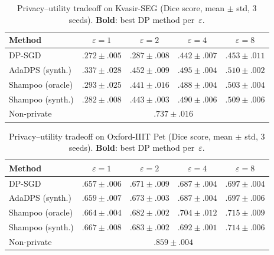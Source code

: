 \begin{table}[t]
\centering
\caption{Privacy--utility tradeoff on Kvasir-SEG (Dice score, mean $\pm$ std, 3 seeds).
  \textbf{Bold}: best DP method per~$\varepsilon$.}
\label{tab:eps_kvasir}
\setlength{\tabcolsep}{3.5pt}
\begin{tabular}{@{}lcccc@{}}
\toprule
\textbf{Method} &
$\varepsilon{=}1$ & $\varepsilon{=}2$ & $\varepsilon{=}4$ & $\varepsilon{=}8$ \\
\midrule
DP-SGD                       & $.272 \pm .005$ & $.287 \pm .008$ & $.442 \pm .007$ & $.453 \pm .011$ \\
AdaDPS (synth.)      & $\mathbf{.337 \pm .028}$ & $\mathbf{.452 \pm .009}$ & $\mathbf{.495 \pm .004}$ & $\mathbf{.510 \pm .002}$ \\
Shampoo (oracle)     & $.293 \pm .025$ & $.441 \pm .016$ & $.488 \pm .004$ & $.503 \pm .004$ \\
Shampoo (synth.)     & $.282 \pm .008$ & $.443 \pm .003$ & $.490 \pm .006$ & $.509 \pm .006$ \\
\midrule
Non-private & \multicolumn{4}{c}{$.737 \pm .016$} \\
\bottomrule
\end{tabular}
\end{table}


\begin{table}[t]
\centering
\caption{Privacy--utility tradeoff on Oxford-IIIT Pet (Dice score, mean $\pm$ std, 3 seeds).
  \textbf{Bold}: best DP method per~$\varepsilon$.}
\label{tab:eps_pet}
\setlength{\tabcolsep}{3.5pt}
\begin{tabular}{@{}lcccc@{}}
\toprule
\textbf{Method} &
$\varepsilon{=}1$ & $\varepsilon{=}2$ & $\varepsilon{=}4$ & $\varepsilon{=}8$ \\
\midrule
DP-SGD                       & $.657 \pm .006$ & $.671 \pm .009$ & $.687 \pm .004$ & $.697 \pm .004$ \\
AdaDPS (synth.)      & $.659 \pm .007$ & $.673 \pm .003$ & $.687 \pm .004$ & $.697 \pm .006$ \\
Shampoo (oracle)     & $.664 \pm .004$ & $\mathbf{.682 \pm .002}$ & $\mathbf{.704 \pm .012}$ & $\mathbf{.715 \pm .009}$ \\
Shampoo (synth.)     & $\mathbf{.667 \pm .008}$ & $.683 \pm .002$ & $.692 \pm .001$ & $.714 \pm .006$ \\
\midrule
Non-private & \multicolumn{4}{c}{$.859 \pm .004$} \\
\bottomrule
\end{tabular}
\end{table}



